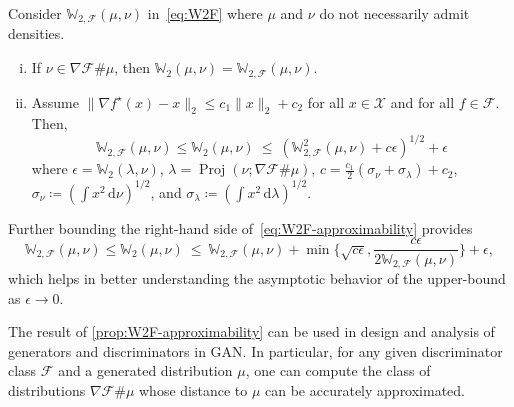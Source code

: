 \documentclass[10pt]{article}
\newcommand{\ud}{\,\mathrm{d}}
\newcommand{\norm}[1]{\|#1\|}
\newcommand{\W}{\mathds{W}}
\newcommand{\calF}{\mathcal{F}}
\newcommand{\calX}{\mathcal{X}}
\numberwithin{equation}{section}
\begin{document}
\begin{theorem}\label{prop:W2F-approximability}
	Consider $\W_{2,\calF}(\mu,\nu)$ in~\eqref{eq:W2F} where $\mu$ and $\nu$ do not necessarily admit densities. 
	\begin{enumerate}[(i)]
	\item \label{prop:W2F-approximability-1}
	If $\nu \in \nabla \calF\#\mu $, then $\W_2(\mu,\nu)=\W_{2,\calF}(\mu,\nu)$.
	
	\item \label{prop:W2F-approximability-2}
	Assume $\norm{\nabla f^\star(x)-x}_2\leq c_1\norm{x}_2 + c_2$ for all $x \in \calX$ and for all $f\in \calF$. Then, 
	\begin{equation}\label{eq:W2F-approximability}
	\W_{2,\calF}(\mu,\nu) \leq 
	\W_2(\mu,\nu)~\leq~ \left(\W^2_{2,\calF}(\mu,\nu) + c\epsilon\right)^{1/2} + \epsilon 
	\end{equation}
	where 
	$\epsilon=\W_2(\lambda,\nu)$, 
	$\lambda =\operatorname{Proj}(\nu;\nabla \calF \# \mu)$, 
	$c=\frac{c_1}{2}(\sigma_\nu + \sigma_\lambda) +c_2$, 
	$\sigma_\nu \coloneqq (\int x^2\ud \nu)^{1/2}$, and 
	$\sigma_\lambda \coloneqq (\int x^2\ud \lambda)^{1/2}$. 
	\end{enumerate}
\end{theorem}

\begin{remark}
	Further bounding the right-hand side of~\eqref{eq:W2F-approximability} provides 
	\begin{equation*}
	\W_{2,\calF}(\mu,\nu) \leq \W_2(\mu,\nu)~\leq~ \W_{2,\calF}(\mu,\nu) + \min\{\sqrt{c\epsilon}, \frac{c\epsilon} {2\W_{2,\calF}(\mu,\nu)} \}+ \epsilon,
	\end{equation*} 
	which helps in better understanding the asymptotic behavior of the upper-bound as $\epsilon \to 0$. 
\end{remark}

The result of \autoref{prop:W2F-approximability} can be used in design and analysis of generators and discriminators in GAN. In particular, for any given discriminator class $\calF$ and a generated distribution $\mu$, one can compute the class of distributions $\nabla \calF \# \mu$ whose distance to $\mu$ can be accurately approximated. 
 
\end{document}
